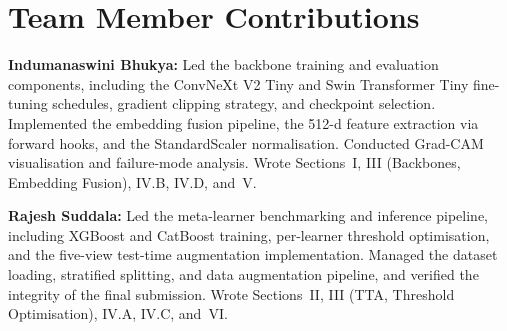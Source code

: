 \documentclass[conference]{IEEEtran}
\begin{document}
\section*{Team Member Contributions}

\textbf{Indumanaswini Bhukya:} Led the backbone training and evaluation components,
including the ConvNeXt V2 Tiny and Swin Transformer Tiny fine-tuning schedules,
gradient clipping strategy, and checkpoint selection.  Implemented the embedding
fusion pipeline, the 512-d feature extraction via forward hooks, and the
StandardScaler normalisation.  Conducted Grad-CAM visualisation and failure-mode
analysis.  Wrote Sections~I, III (Backbones, Embedding Fusion), IV.B, IV.D, and~V.

\textbf{Rajesh Suddala:} Led the meta-learner benchmarking and inference pipeline,
including XGBoost and CatBoost training, per-learner threshold optimisation, and
the five-view test-time augmentation implementation.  Managed the dataset loading,
stratified splitting, and data augmentation pipeline, and verified the integrity of
the final submission.  Wrote Sections~II, III (TTA, Threshold Optimisation),
IV.A, IV.C, and~VI.
\end{document}
